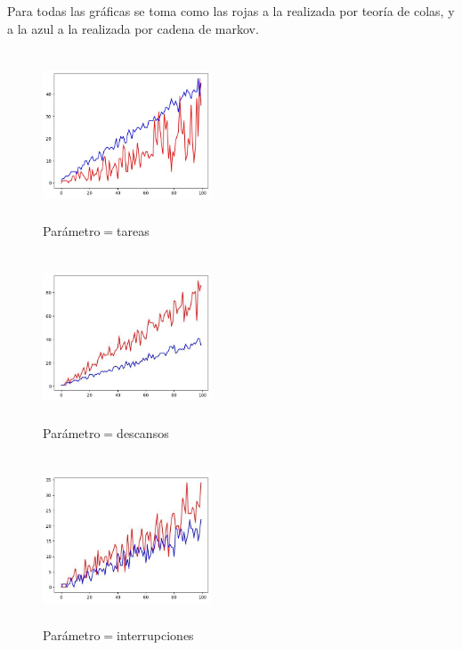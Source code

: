 \documentclass[10pt,a4paper,twocolumn]{article}
\begin{document}
Para todas las gr\'aficas se toma como las rojas a la realizada por teor\'ia
de colas, y a la azul a la realizada por cadena de markov.

\begin{figure}[H] %
    \centering %
    \includegraphics[width=5cm, height=5cm]{comparacion1.jpg} %
    \caption{Par\'ametro$ = $tareas} %
    \label{fig:mi_imagen1} %
\end{figure}

\begin{figure}[H] %
    \centering 
    \includegraphics[width=5cm, height=5cm]{comparacion2.jpg} 
    \caption{Par\'ametro$ = $descansos} 
    \label{fig:mi_imagen2} 
\end{figure}

\begin{figure}[H] %
    \centering 
    \includegraphics[width=5cm, height=5cm]{comparacion3.jpg} 
    \caption{Par\'ametro$ = $interrupciones} 
    \label{fig:mi_imagen3} 
\end{figure}
\end{document}
